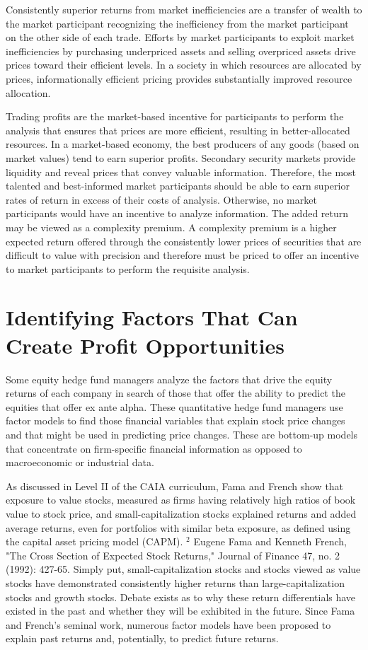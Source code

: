 \documentclass[11pt]{article}
\begin{document}
Consistently superior returns from market inefficiencies are a transfer of wealth to the market participant recognizing the inefficiency from the market participant on the other side of each trade. Efforts by market participants to exploit market inefficiencies by purchasing underpriced assets and selling overpriced assets drive prices toward their efficient levels. In a society in which resources are allocated by prices, informationally efficient pricing provides substantially improved resource allocation.

Trading profits are the market-based incentive for participants to perform the analysis that ensures that prices are more efficient, resulting in better-allocated resources. In a market-based economy, the best producers of any goods (based on market values) tend to earn superior profits. Secondary security markets provide liquidity and reveal prices that convey valuable information. Therefore, the most talented and best-informed market participants should be able to earn superior rates of return in excess of their costs of analysis. Otherwise, no market participants would have an incentive to analyze information. The added return may be viewed as a complexity premium. A complexity premium is a higher expected return offered through the consistently lower prices of securities that are difficult to value with precision and therefore must be priced to offer an incentive to market participants to perform the requisite analysis.

\section*{Identifying Factors That Can Create Profit Opportunities}
Some equity hedge fund managers analyze the factors that drive the equity returns of each company in search of those that offer the ability to predict the equities that offer ex ante alpha. These quantitative hedge fund managers use factor models to find those financial variables that explain stock price changes and that might be used in predicting price changes. These are bottom-up models that concentrate on firm-specific financial information as opposed to macroeconomic or industrial data.

As discussed in Level II of the CAIA curriculum, Fama and French show that exposure to value stocks, measured as firms having relatively high ratios of book value to stock price, and small-capitalization stocks explained returns and added average returns, even for portfolios with similar beta exposure, as defined using the capital asset pricing model (CAPM). ${ }^{2}$ Eugene Fama and Kenneth French, "The Cross Section of Expected Stock Returns," Journal of Finance 47, no. 2 (1992): 427-65. Simply put, small-capitalization stocks and stocks viewed as value stocks have demonstrated consistently higher returns than large-capitalization stocks and growth stocks. Debate exists as to why these return differentials have existed in the past and whether they will be exhibited in the future. Since Fama and French's seminal work, numerous factor models have been proposed to explain past returns and, potentially, to predict future returns.
\end{document}
